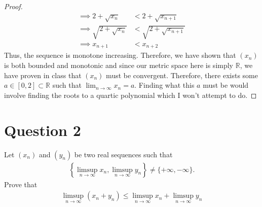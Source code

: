 \documentclass[10pt,a4paper]{article}
\theoremstyle{definition}
\theoremstyle{definition}
\begin{document}
\begin{proof}
\begin{align*}
\implies 2 + \sqrt{x_n} &< 2 + \sqrt{x_{n+1}}\\
\implies \sqrt{2 + \sqrt{x_n}} &< \sqrt{2 + \sqrt{x_{n+1}}}\\
\implies x_{n + 1} &< x_{n+2}
\end{align*}
Thus, the sequence is monotone increasing. Therefore, we have shown that $(x_n)$ is both bounded and monotonic and since our metric space here is simply $\mathbb{R}$, we have proven in class that $(x_n)$ must be convergent. Therefore, there exists some $a \in [0, 2] \subset \mathbb{R}$ such that $\lim_{n \to \infty} x_n = a$. Finding what this $a$ must be would involve finding the roots to a quartic polynomial which I won't attempt to do.
\end{proof}

\section*{Question 2}
Let $(x_n)$ and $(y_n)$ be two real sequences such that 
\begin{align*}
\left\{\limsup_{n \to \infty} x_n, \limsup_{n \to \infty} y_n \right\} \neq \{+\infty, -\infty\}.
\end{align*}
Prove that 
\begin{align*}
\limsup_{n \to \infty} (x_n + y_n) \leq \limsup_{n \to \infty} x_n + \limsup_{n \to \infty} y_n
\end{align*}
\end{document}

